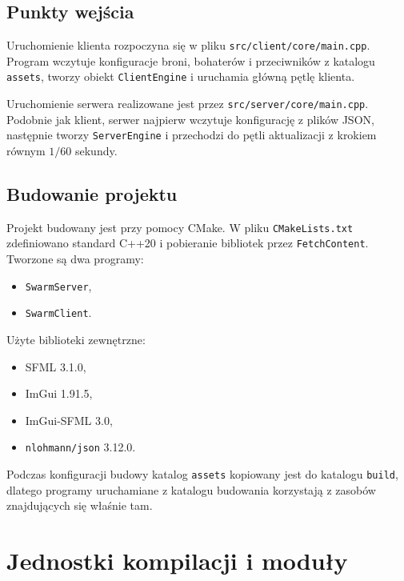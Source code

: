 \documentclass[a4paper,12pt]{article}
\begin{document}
\subsection{Punkty wejścia}
Uruchomienie klienta rozpoczyna się w pliku \texttt{src/client/core/main.cpp}. Program wczytuje konfiguracje broni, bohaterów i przeciwników z katalogu \texttt{assets}, tworzy obiekt \texttt{ClientEngine} i uruchamia główną pętlę klienta.

Uruchomienie serwera realizowane jest przez \texttt{src/server/core/main.cpp}. Podobnie jak klient, serwer najpierw wczytuje konfigurację z plików JSON, następnie tworzy \texttt{ServerEngine} i przechodzi do pętli aktualizacji z krokiem równym $1/60$ sekundy.

\subsection{Budowanie projektu}
Projekt budowany jest przy pomocy CMake. W pliku \texttt{CMakeLists.txt} zdefiniowano standard C++20 i pobieranie bibliotek przez \texttt{FetchContent}. Tworzone są dwa programy:
\begin{itemize}[leftmargin=1.5cm]
    \item \texttt{SwarmServer},
    \item \texttt{SwarmClient}.
\end{itemize}

Użyte biblioteki zewnętrzne:
\begin{itemize}[leftmargin=1.5cm]
    \item SFML 3.1.0,
    \item ImGui 1.91.5,
    \item ImGui-SFML 3.0,
    \item \texttt{nlohmann/json} 3.12.0.
\end{itemize}

Podczas konfiguracji budowy katalog \texttt{assets} kopiowany jest do katalogu \texttt{build}, dlatego programy uruchamiane z katalogu budowania korzystają z zasobów znajdujących się właśnie tam.

\section{Jednostki kompilacji i moduły}
\end{document}
